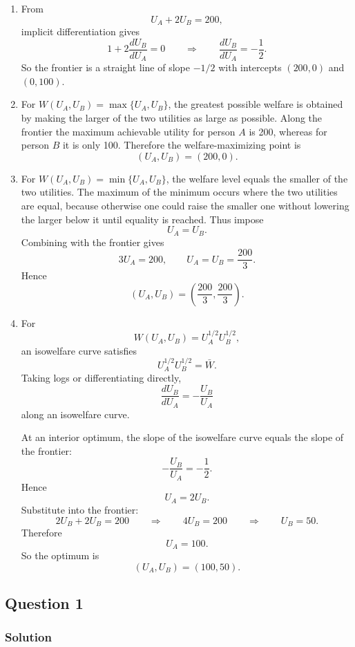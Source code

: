 \documentclass[12pt]{article}
\begin{document}
\begin{enumerate}[label=(\alph*)]
    \item
    From
    \[
    U_A+2U_B=200,
    \]
    implicit differentiation gives
    \[
    1+2\frac{dU_B}{dU_A}=0
    \qquad\Longrightarrow\qquad
    \frac{dU_B}{dU_A}=-\frac12.
    \]
    So the frontier is a straight line of slope $-1/2$ with intercepts $(200,0)$ and $(0,100)$.

    \item
    For $W(U_A,U_B)=\max\{U_A,U_B\}$, the greatest possible welfare is obtained by making the larger of the two utilities as large as possible. Along the frontier the maximum achievable utility for person $A$ is 200, whereas for person $B$ it is only 100. Therefore the welfare-maximizing point is
    \[
    \boxed{(U_A,U_B)=(200,0).}
    \]

    \item
    For $W(U_A,U_B)=\min\{U_A,U_B\}$, the welfare level equals the smaller of the two utilities. The maximum of the minimum occurs where the two utilities are equal, because otherwise one could raise the smaller one without lowering the larger below it until equality is reached. Thus impose
    \[
    U_A=U_B.
    \]
    Combining with the frontier gives
    \[
    3U_A=200,
    \qquad
    U_A=U_B=\frac{200}{3}.
    \]
    Hence
    \[
    \boxed{\left(U_A,U_B\right)=\left(\frac{200}{3},\frac{200}{3}\right).}
    \]

    \item
    For
    \[
    W(U_A,U_B)=U_A^{1/2}U_B^{1/2},
    \]
    an isowelfare curve satisfies
    \[
    U_A^{1/2}U_B^{1/2}=\bar W.
    \]
    Taking logs or differentiating directly,
    \[
    \frac{dU_B}{dU_A}=-\frac{U_B}{U_A}
    \]
    along an isowelfare curve.

    At an interior optimum, the slope of the isowelfare curve equals the slope of the frontier:
    \[
    -\frac{U_B}{U_A}=-\frac12.
    \]
    Hence
    \[
    U_A=2U_B.
    \]
    Substitute into the frontier:
    \[
    2U_B+2U_B=200
    \qquad\Longrightarrow\qquad
    4U_B=200
    \qquad\Longrightarrow\qquad
    U_B=50.
    \]
    Therefore
    \[
    U_A=100.
    \]
    So the optimum is
    \[
    \boxed{(U_A,U_B)=(100,50).}
    \]
\end{enumerate}

\newpage
\subsection{ Question 1}
\subsubsection{Solution}
\end{document}
